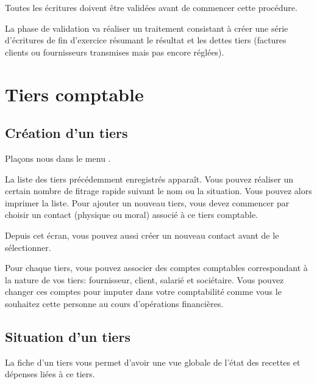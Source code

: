 \documentclass[a4paper,10pt,oneside,french]{sphinxmanual}
\begin{document}
 Toutes les écritures doivent être validées avant de commencer cette procédure.

La phase de validation va réaliser un traitement consistant à
créer une série d’écritures de fin d’exercice résumant le résultat et
les dettes tiers (factures clients ou fournisseurs transmises mais pas encore réglées).


\section{Tiers comptable}
\label{\detokenize{accounting/third:tiers-comptable}}\label{\detokenize{accounting/third::doc}}

\subsection{Création d’un tiers}
\label{\detokenize{accounting/third:creation-d-un-tiers}}
Plaçons nous dans le menu .

\noindent{}

La liste des tiers précédemment enregistrés apparaît.
Vous pouvez réaliser un certain nombre de fitrage rapide suivant le nom ou
la situation. Vous pouvez alors imprimer la liste.
Pour ajouter un nouveau tiers, vous devez commencer par choisir un contact (physique
ou moral) associé à ce tiers comptable.

\noindent{}

Depuis cet écran, vous pouvez aussi créer un nouveau contact avant de le sélectionner.

\noindent{}

Pour chaque tiers, vous pouvez associer des comptes comptables
correspondant à la nature de vos tiers: fournisseur, client, salarié et
sociétaire. Vous pouvez changer ces comptes pour imputer dans votre
comptabilité comme vous le souhaitez cette personne au cours
d’opérations financières.


\subsection{Situation d’un tiers}
\label{\detokenize{accounting/third:situation-d-un-tiers}}
La fiche d’un tiers vous permet d’avoir une vue globale de l’état des recettes et dépenses liées à ce tiers.

\noindent{}
\end{document}
